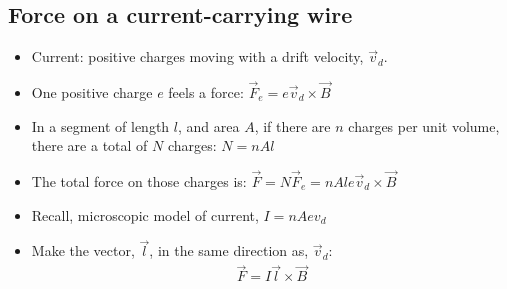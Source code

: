 \documentclass[aspectratio=169,
hyperref={colorlinks,urlcolor=blue}
]{beamer}
\begin{document}
\subsection{Force on a current-carrying wire}
\label{subsec:forceonacurrentcarryingwire}
{
\vspace{-0.25cm}
\begin{itemize}
\item<1-> Current: positive charges moving with a drift velocity, $\vec v_d$. 
\item<2-> One positive charge $e$ feels a force: $\vec F_e = e \vec v_d \times \vec B$
\item<3-> In a segment of length $l$, and area $A$, if there are $n$ charges per unit volume, there are a total of $N$ charges:
$N=nAl$
\item<4-> The total force on those charges is: $\vec F=N\vec F_e=nAle \vec v_d \times \vec B$
\item<5->  Recall, microscopic model of current, $I=nAev_d$
\item<6->  Make  the vector, $\vec l$, in the same direction as, $\vec v_d$: 
\begin{align*}
\boxed{
\vec F = I \vec l \times \vec B}
\end{align*}
\end{itemize}
}
\end{document}
